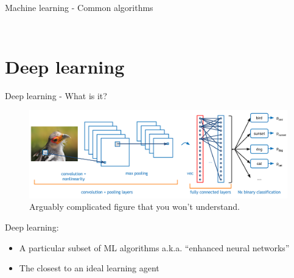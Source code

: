\documentclass[10pt]{beamer}
\begin{document}
\begin{frame}{Machine learning - Common algorithms}
\begin{columns}
\begin{column}{0.5\textwidth}
\begin{figure}
\begin{subfigure}{.5\textwidth}
				\end{subfigure}
				\begin{subfigure}{\textwidth}
					\centering
				\end{subfigure}		
			\end{figure}
		\end{column}
	\end{columns}
\end{frame}

\section{Deep learning}
\begin{frame}{Deep learning - What is it?}
	\begin{figure}
		\centering
		\includegraphics[width=\linewidth]{deeplearning-intro-ml}
		\caption{Arguably complicated figure that you won't understand.}
	\end{figure}
	Deep learning:
	\begin{itemize}
		\item A particular \alert{subset} of ML algorithms a.k.a. ``enhanced neural networks''
		\item The closest to an \alert{ideal learning agent}
	\end{itemize}
\end{frame}
\end{document}
